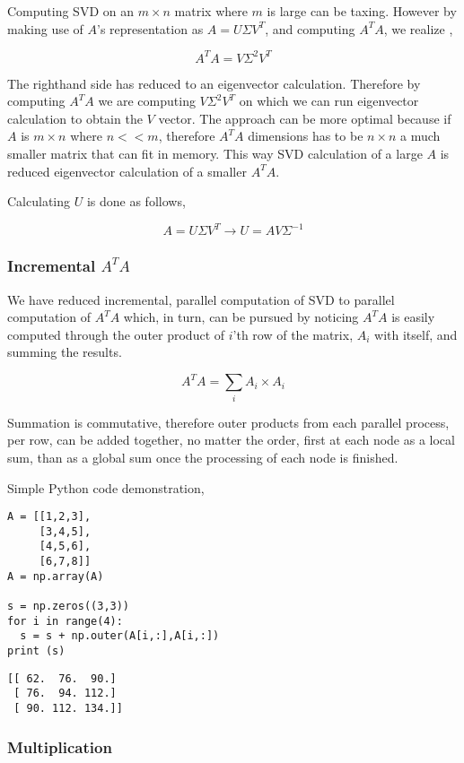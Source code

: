 \documentclass{article}
\begin{document}
Computing SVD on an $m \times n$ matrix where $m$ is large can be
taxing. However by making use of $A$'s representation as $A = U \Sigma V^T$, and
computing $A^TA$, we realize \cite{zadeh},

$$
A^TA = V \Sigma^2 V^T 
$$

The righthand side has reduced to an eigenvector calculation. Therefore by
computing $A^TA$ we are computing $V \Sigma^2 V^T $ on which we can run
eigenvector calculation to obtain the $V$ vector. The approach can be more
optimal because if $A$ is $m \times n$ where $n << m$, therefore $A^TA$
dimensions has to be $n \times n$ a much smaller matrix that can fit in memory.
This way SVD calculation of a large $A$ is reduced eigenvector calculation of a
smaller $A^TA$.

Calculating $U$ is done as follows,

$$
A = U \Sigma V^T \to U = A V \Sigma^{-1}
$$

\subsubsection{Incremental $A^T A$}

We have reduced incremental, parallel computation of SVD to parallel computation
of $A^T A$ which, in turn, can be pursued by noticing $A^T A$ is easily computed
through the outer product of $i$'th row of the matrix, $A_{i}$ with itself, and
summing the results.

$$
A^T A = \sum_{i} A_i \times A_i
$$

Summation is commutative, therefore outer products from each parallel process,
per row, can be added together, no matter the order, first at each node as a
local sum, than as a global sum once the processing of each node is finished.

Simple Python code demonstration,

\begin{verbatim}
A = [[1,2,3],
     [3,4,5],
     [4,5,6],
     [6,7,8]]
A = np.array(A)

s = np.zeros((3,3))
for i in range(4):
  s = s + np.outer(A[i,:],A[i,:])
print (s)    
\end{verbatim}

\begin{verbatim}
[[ 62.  76.  90.]
 [ 76.  94. 112.]
 [ 90. 112. 134.]]
\end{verbatim}

\subsubsection{Multiplication}
\end{document}
